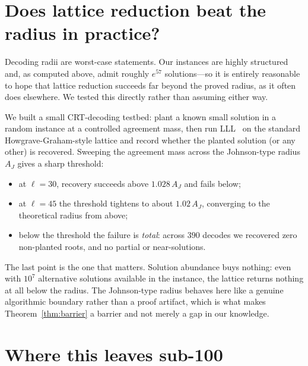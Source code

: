 \section{Does lattice reduction beat the radius in practice?}

Decoding radii are worst-case statements. Our instances are highly structured
and, as computed above, admit roughly $e^{57}$ solutions---so it is entirely
reasonable to hope that lattice reduction succeeds far beyond the proved radius,
as it often does elsewhere. We tested this directly rather than assuming either
way.

We built a small CRT-decoding testbed: plant a known small solution in a
random instance at a controlled agreement mass, then run
LLL~\cite{LLL} on the standard Howgrave-Graham-style lattice and record whether
the planted solution (or any other) is recovered. Sweeping the agreement mass
across the Johnson-type radius $A_J$ gives a sharp threshold:

\begin{itemize}
\item at $\ell=30$, recovery succeeds above $1.028\,A_J$ and fails below;
\item at $\ell=45$ the threshold tightens to about $1.02\,A_J$, converging to
the theoretical radius from above;
\item below the threshold the failure is \emph{total}: across $390$ decodes we
recovered zero non-planted roots, and no partial or near-solutions.
\end{itemize}

The last point is the one that matters. Solution abundance buys nothing: even
with $10^{7}$ alternative solutions available in the instance, the lattice
returns nothing at all below the radius. The Johnson-type radius behaves here
like a genuine algorithmic boundary rather than a proof artifact, which is what
makes Theorem~\ref{thm:barrier} a barrier and not merely a gap in our knowledge.

\section{Where this leaves sub-100}

